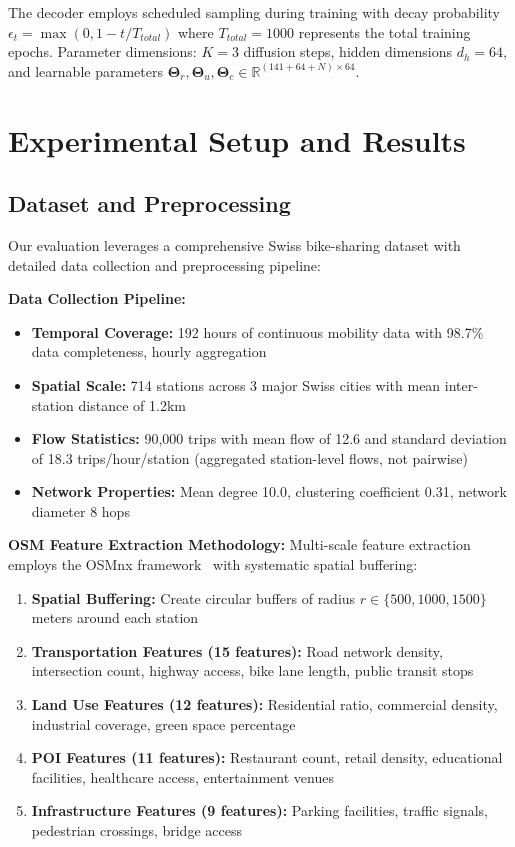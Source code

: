 \documentclass[sigconf,review,nonacm]{acmart}
\begin{document}
The decoder employs scheduled sampling during training with decay probability $\epsilon_t = \max(0, 1 - t/T_{total})$ where $T_{total}=1000$ represents the total training epochs. Parameter dimensions: $K=3$ diffusion steps, hidden dimensions $d_h=64$, and learnable parameters $\boldsymbol{\Theta}_r, \boldsymbol{\Theta}_u, \boldsymbol{\Theta}_c \in \mathbb{R}^{(141+64+N) \times 64}$.

\section{Experimental Setup and Results}

\subsection{Dataset and Preprocessing}

Our evaluation leverages a comprehensive Swiss bike-sharing dataset with detailed data collection and preprocessing pipeline:

\textbf{Data Collection Pipeline:}
\begin{itemize}
\item \textbf{Temporal Coverage:} 192 hours of continuous mobility data with 98.7\% data completeness, hourly aggregation
\item \textbf{Spatial Scale:} 714 stations across 3 major Swiss cities with mean inter-station distance of 1.2km  
\item \textbf{Flow Statistics:} 90,000 trips with mean flow of 12.6 and standard deviation of 18.3 trips/hour/station (aggregated station-level flows, not pairwise)
\item \textbf{Network Properties:} Mean degree 10.0, clustering coefficient 0.31, network diameter 8 hops
\end{itemize}

\textbf{OSM Feature Extraction Methodology:}
Multi-scale feature extraction employs the OSMnx framework~\cite{boeing2017} with systematic spatial buffering:
\begin{enumerate}
\item \textbf{Spatial Buffering:} Create circular buffers of radius $r \in \{500, 1000, 1500\}$ meters around each station
\item \textbf{Transportation Features (15 features):} Road network density, intersection count, highway access, bike lane length, public transit stops
\item \textbf{Land Use Features (12 features):} Residential ratio, commercial density, industrial coverage, green space percentage
\item \textbf{POI Features (11 features):} Restaurant count, retail density, educational facilities, healthcare access, entertainment venues
\item \textbf{Infrastructure Features (9 features):} Parking facilities, traffic signals, pedestrian crossings, bridge access
\end{enumerate}
\end{document}
